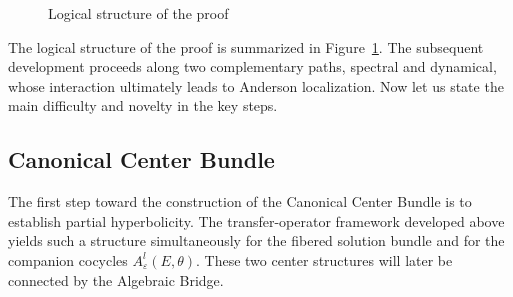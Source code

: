 \documentclass[reqno,11pt]{amsart}
\begin{document}
\begin{figure}[htbp]
{
}
\vspace{0.2cm}
\caption{Logical structure of the proof}
\label{fig:logic_architecture}
\end{figure}

 The logical structure of the proof is summarized in Figure~\ref{fig:logic_architecture}. The subsequent development proceeds along two complementary paths, spectral and dynamical, whose interaction ultimately leads to Anderson localization. Now let us state the main difficulty and novelty in the key steps. 

\subsection{Canonical Center Bundle}
The first step toward the construction of the Canonical Center Bundle is to establish partial hyperbolicity. The transfer-operator framework developed above yields such a structure simultaneously for the fibered solution bundle and for the companion cocycles $A^l_{\varepsilon}(E,\theta)$. These two center structures will later be connected by the Algebraic Bridge.
\end{document}
